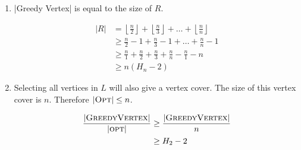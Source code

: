 \documentclass{article}
\begin{document}
\begin{solution}
\begin{enumerate}[label = (\alph*)]
    \item |Greedy Vertex| is equal to the size of $R$.

    \begin{align*}
        |R|&= \left\lfloor \frac{n}{2} \right\rfloor + \left\lfloor \frac{n}{3} \right\rfloor +\dots + \left\lfloor \frac{n}{n} \right\rfloor\\
        &\geq \frac{n}{2} - 1 + \frac{n}{3} - 1 + \dots + \frac{n}{n} - 1\\
        &\geq \frac{n}{1} + \frac{n}{2} + \frac{n}{3} + \frac{n}{n} - \frac{n}{1} - n\\
        &\geq n(H_n - 2)
    \end{align*}
    
    \item Selecting all vertices in $L$ will also give a vertex cover. The size of this vertex cover is $n$.
    Therefore $\lvert \mathsf{\textsc{Opt}} \rvert \leq n$.
    
    \begin{align*}
        \frac{\lvert \mathsf{\textsc{GreedyVertex}} \rvert}{\lvert \mathsf{\textsc{opt}} \rvert} &\geq \frac{\lvert \mathsf{\textsc{GreedyVertex}} \rvert}{n}\\
        &\geq H_2 - 2
    \end{align*}
\end{enumerate}
\end{solution}
\end{document}
